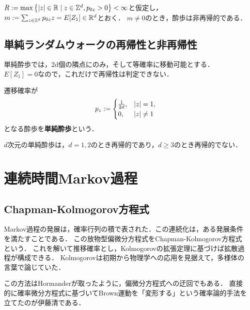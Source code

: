 \documentclass[uplatex,dvipdfmx]{jsreport}
\begin{document}
\begin{theorem}[非再帰性の十分条件]
    $R:=\max\left\{\lvert z\rvert\in\mathbb{R}\mid z\in\mathbb{Z}^d,p_{0z}>0\right\}<\infty$と仮定し，
    $m:=\sum_{z\in\mathbb{Z}^d}p_{0z}z=E[Z_1]\in\mathbb{R}^d$とおく．
    $m\ne0$のとき，酔歩は非再帰的である．
\end{theorem}

\subsection{単純ランダムウォークの再帰性と非再帰性}

\begin{tcolorbox}[colframe=ForestGreen, colback=ForestGreen!10!white,breakable,colbacktitle=ForestGreen!40!white,coltitle=black,fonttitle=\bfseries\sffamily,
title=]
    単純酔歩では，2d個の隣点にのみ，そして等確率に移動可能とする．
    $E[Z_1]=0$なので，これだけで再帰性は判定できない．
\end{tcolorbox}

\begin{definition}
    遷移確率が
    \[p_z:=\begin{cases}
        \frac{1}{2d},&\lvert z\rvert=1,\\
        0,&\lvert z\rvert\ne1
    \end{cases}\]
    となる酔歩を\textbf{単純酔歩}という．
\end{definition}

\begin{theorem}[Polya]
    $d$次元の単純酔歩は，$d=1,2$のとき再帰的であり，$d\ge3$のとき再帰的でない．
\end{theorem}

\section{連続時間Markov過程}

\subsection{Chapman-Kolmogorov方程式}

\begin{tcolorbox}[colframe=ForestGreen, colback=ForestGreen!10!white,breakable,colbacktitle=ForestGreen!40!white,coltitle=black,fonttitle=\bfseries\sffamily,
title=熱核の半群性]
    Markov過程の発展は，確率行列の積で表された．この連続化は，ある発展条件を満たすことである．
    この放物型偏微分方程式をChapman-Kolmogorov方程式という．
    これを解いて推移確率とし，Kolmogorovの拡張定理に基づけば拡散過程が構成できる．
    Kolmogorovは初期から物理学への応用を見据えて，多様体の言葉で論じていた．

    この方法はHormanderが取ったように，偏微分方程式への迂回でもある．
    直接的に確率微分方程式に基づいてBrown運動を「変形する」という確率論的手法を立てたのが伊藤清である．
\end{tcolorbox}
\end{document}
